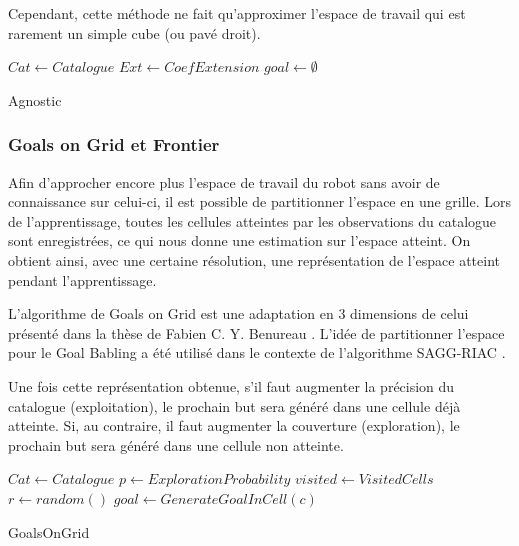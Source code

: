 \documentclass[11pt,french]{report}
\begin{document}
\phantom{INVISIBLE LINE}

Cependant, cette méthode ne fait qu'approximer l'espace de travail qui est rarement un simple cube (ou pavé droit).

\begin{algorithm}[h]
    \DontPrintSemicolon
    \LinesNumbered
    $Cat \leftarrow Catalogue$ \;
    $Ext \leftarrow CoefExtension$ \;
    $goal \leftarrow \emptyset$ \;
    \caption{\label{alg:Agnostic} Agnostic}
\end{algorithm}

\pagebreak

\subsubsection{Goals on Grid et Frontier}

Afin d'approcher encore plus l'espace de travail du robot sans avoir de connaissance sur celui-ci, il est possible de partitionner l'espace en une grille.
Lors de l'apprentissage, toutes les cellules atteintes par les observations du catalogue sont enregistrées, ce qui nous donne une estimation sur l'espace atteint.
On obtient ainsi, avec une certaine résolution, une représentation de l'espace atteint pendant l'apprentissage.

\phantom{INVISIBLE LINE}

L'algorithme de Goals on Grid est une adaptation en 3 dimensions de celui présenté dans la thèse de Fabien C. Y. Benureau \cite{TheseBenureau}.
L'idée de partitionner l'espace pour le Goal Babling a été utilisé dans le contexte de l'algorithme SAGG-RIAC \cite{Intrinsic_motivation}.

\phantom{INVISIBLE LINE}

Une fois cette représentation obtenue, s'il faut augmenter la précision du catalogue (exploitation), le prochain but sera généré dans une cellule déjà atteinte.
Si, au contraire, il faut augmenter la couverture (exploration), le prochain but sera généré dans une cellule non atteinte.

\begin{algorithm}[h]
    \DontPrintSemicolon
    \LinesNumbered
    $Cat \leftarrow Catalogue$ \;
    $p \leftarrow ExplorationProbability$ \;
    $visited \leftarrow VisitedCells$ \;
    $r \leftarrow random()$ \;
    $goal \leftarrow GenerateGoalInCell(c)$ \;
    \caption{\label{alg:GoalsOnGrid} GoalsOnGrid}
\end{algorithm}
\end{document}
